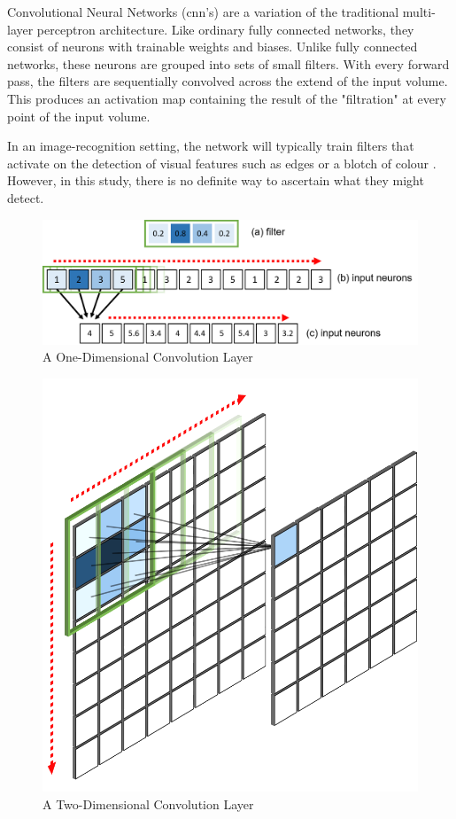 \documentclass[11pt,oneside,openany,a4paper,english, report, goldenblock
]{usthesis}
\begin{document}
Convolutional Neural Networks (\acrshort{cnn}'s) are a variation of the traditional multi-layer perceptron architecture. Like ordinary fully connected networks, they consist of neurons with trainable weights and biases. Unlike fully connected networks, these neurons are grouped into sets of small filters. With every forward pass, the filters are sequentially convolved across the extend of the input volume. This produces an activation map containing the result of the "filtration" at every point of the input volume.

In an image-recognition setting, the network will typically train filters that activate on the detection of visual features such as edges or a blotch of colour \citep{cs231n}. However, in this study, there is no definite way to ascertain what they might detect.

\begin{figure}[h]
	\centering
	\includegraphics[width=0.9\linewidth]{Images/Diagrams/1D_Convolution}
	\caption[1D Convolutional Layer]{A One-Dimensional Convolution Layer}
	\label{fig:1dconvolution}
\end{figure}

\begin{figure}[h]
	\centering
	\includegraphics[width=0.4\linewidth]{Images/Diagrams/2D_Convolution}
	\caption[2D Convolution Layer]{A Two-Dimensional Convolution Layer}
	\label{fig:2dconvolution}
\end{figure}
\end{document}
